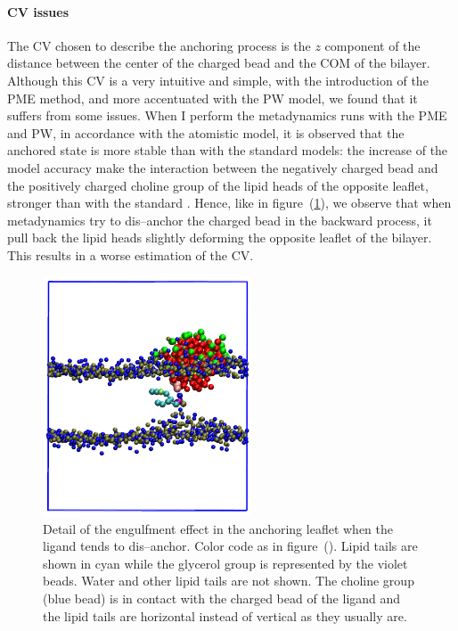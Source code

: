 \paragraph{\textbf{CV issues}} The \ac{CV} chosen to describe the anchoring process is the $z$ component of the distance between the center of the charged bead and the \ac{COM} of the bilayer. Although this \ac{CV} is a very intuitive and simple, with the introduction of the \ac{PME} method, and more accentuated with the \ac{PW} model, we found that it suffers from some issues. When I perform the metadynamics runs with the \ac{PME} and \ac{PW}, in accordance with the atomistic model, it is observed that the anchored state is more stable than with the standard \martini models: the increase of the model accuracy make the interaction between the negatively charged bead and the positively charged choline group of the lipid heads of the opposite leaflet, stronger than with the standard \martini. Hence, like in figure~(\ref{fig:engulfment}), we observe that when metadynamics try to dis--anchor the charged bead in the backward process, it pull back the lipid heads slightly deforming the opposite leaflet of the bilayer. This results in a worse estimation of the \ac{CV}.
\begin{figure}
	\centering
	\includegraphics[width=0.55\textwidth]{./img/patchedEngulfment}
	\caption{Detail of the engulfment effect in the anchoring leaflet when the ligand tends to dis--anchor. Color code as in figure~(). Lipid tails are shown in cyan while the glycerol group is represented by the violet beads. Water and other lipid tails are not shown. The choline group (blue bead) is in contact with the charged bead of the ligand and the lipid tails are horizontal instead of vertical as they usually are.}
	\label{fig:engulfment}
\end{figure}
